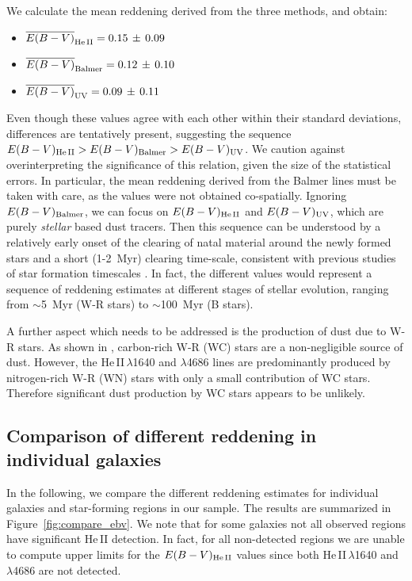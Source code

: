 \documentclass[linenumbers]{aastex63}
\begin{document}
We calculate the mean reddening derived from the three methods, and obtain:
\begin{itemize}
    \item \;$\overline{E(B-V)}_{\rm He\,II} = 0.15\,\pm\,0.09$  \item \;$\overline{E(B-V)}_{\rm Balmer} = 0.12\,\pm\,0.10$
    \item \;$\overline{E(B-V)}_{\rm UV} = 0.09\,\pm\,0.11$
\end{itemize}
%
Even though these values agree with each other within their standard deviations, differences are tentatively present, suggesting the sequence
$E(B-V)_{\rm He\,II} > E(B-V)_{\rm Balmer} > E(B-V)_{\rm UV}$. We caution against overinterpreting the significance of this relation, given the size of the statistical errors. In particular, the mean reddening derived from the Balmer lines must be taken with care, as the values were not obtained co-spatially. Ignoring $E(B-V)_{\rm Balmer}$, we can focus on $E(B-V)_{\rm He\,II}$ and $E(B-V)_{\rm UV}$, which are purely {\it stellar} based dust tracers. Then this sequence can be understood by a relatively early onset of the clearing of natal material around the newly formed stars and a short (1-2~Myr) clearing time-scale, consistent with previous studies of star formation timescales \citep[e.g.,][]{whitmore_using_2011,hollyhead_studying_2015, sokal_prevalence_2016,hannon_h_2022}. In fact, the different values would represent a sequence of reddening estimates at different stages of stellar evolution, ranging from $\sim$5~Myr (W-R stars) to $\sim$100~Myr (B stars).

A further aspect which needs to be addressed is the production of dust due to W-R stars. As shown in \citet{lau_revisiting_2020,lau_nested_2022}, carbon-rich W-R (WC) stars are a non-negligible source of dust. However, the He\,II\,$\lambda$1640 and $\lambda$4686 lines are predominantly produced by nitrogen-rich W-R (WN) stars with only a small contribution of WC stars. 
Therefore significant dust production by WC stars appears to be unlikely.

\subsection{Comparison of different reddening in individual galaxies}

In the following, we compare the different reddening estimates for individual galaxies and star-forming regions in our sample. The results are summarized in Figure~\ref{fig:compare_ebv}. We note that for some galaxies not all observed regions have significant He\,II detection. In fact, for all non-detected regions we are unable to compute upper limits for the $E(B-V)_{\rm He\,II}$ values since both He\,II\,$\lambda$1640 and $\lambda$4686 are not detected.
\end{document}
